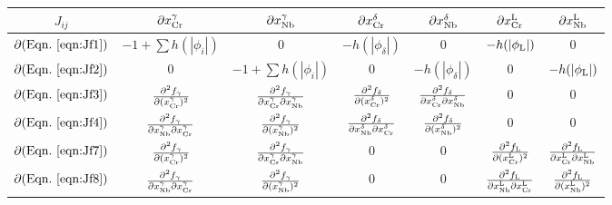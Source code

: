 \documentclass[10pt]{article}
\begin{document}
		\begin{table}[ht]\centering
		\begin{small}
		\setlength\extrarowheight{10pt}
		\begin{tabular}{|c|cccccc|}\hline
		$J_{ij}$  & $\partial x_{\ce{Cr}}^{\gamma}$ & $\partial x_{\ce{Nb}}^{\gamma}$ & $\partial x_{\ce{Cr}}^{\delta}$ & $\partial x_{\ce{Nb}}^{\delta}$
		  & $\partial x_{\ce{Cr}}^{\ce{L}}$ & $\partial x_{\ce{Nb}}^{\ce{L}}$\\\hline
		$\partial (\mathrm{Eqn.}~{\ref{eqn:Jf1}})$ & $-1+\sum h(|\phi_i|)$ & 0 & $-h(|\phi_{\delta}|)$ & 0 & $-h(|\phi_{\ce{L}}|)$ & 0\\
		$\partial (\mathrm{Eqn.}~{\ref{eqn:Jf2}})$ & 0 & $-1+\sum h(|\phi_i|)$ & 0 & $-h(|\phi_{\delta}|)$ & 0 & $-h(|\phi_{\ce{L}}|)$\\
		$\partial (\mathrm{Eqn.}~{\ref{eqn:Jf3}})$ & $\frac{\partial^2 f_{\gamma}}{\partial(x_{\ce{Cr}}^{\gamma})^2}$ & $\frac{\partial^2 f_{\gamma}}{\partial x_{\ce{Cr}}^{\gamma}\partial x_{\ce{Nb}}^{\gamma}}$ 
		& $\frac{\partial^2 f_{\delta}}{\partial(x_{\ce{Cr}}^{\delta})^2}$ & $\frac{\partial^2 f_{\delta}}{\partial x_{\ce{Cr}}^{\delta}\partial x_{\ce{Nb}}^{\delta}}$
		& 0 & 0\\
		$\partial (\mathrm{Eqn.}~{\ref{eqn:Jf4}})$ & $\frac{\partial^2 f_{\gamma}}{\partial x_{\ce{Nb}}^{\gamma}\partial x_{\ce{Cr}}^{\gamma}}$ & $\frac{\partial^2 f_{\gamma}}{\partial(x_{\ce{Nb}}^{\gamma})^2}$
		& $\frac{\partial^2 f_{\delta}}{\partial x_{\ce{Nb}}^{\delta} \partial x_{\ce{Cr}}^{\delta}}$ & $\frac{\partial^2 f_{\delta}}{\partial(x_{\ce{Nb}}^{\delta})^2}$
		& 0 & 0\\
		$\partial (\mathrm{Eqn.}~{\ref{eqn:Jf7}})$ & $\frac{\partial^2 f_{\gamma}}{\partial(x_{\ce{Cr}}^{\gamma})^2}$ & $\frac{\partial^2 f_{\gamma}}{\partial x_{\ce{Cr}}^{\gamma}\partial x_{\ce{Nb}}^{\gamma}}$ 
		& 0 & 0 & $\frac{\partial^2 f_{\ce{L}}}{\partial(x_{\ce{Cr}}^{\ce{L}})^2}$ & $\frac{\partial^2 f_{\ce{L}}}{\partial x_{\ce{Cr}}^{\ce{L}}\partial x_{\ce{Nb}}^{\ce{L}}}$
		\\
		$\partial (\mathrm{Eqn.}~{\ref{eqn:Jf8}})$ & $\frac{\partial^2 f_{\gamma}}{\partial x_{\ce{Nb}}^{\gamma}\partial x_{\ce{Cr}}^{\gamma}}$ & $\frac{\partial^2 f_{\gamma}}{\partial(x_{\ce{Nb}}^{\gamma})^2}$
		& 0 & 0 & $\frac{\partial^2 f_{\ce{L}}}{\partial x_{\ce{Nb}}^{\ce{L}} \partial x_{\ce{Cr}}^{\ce{L}}}$ & $\frac{\partial^2 f_{\ce{L}}}{\partial(x_{\ce{Nb}}^{\ce{L}})^2}$
		\\\hline
		\end{tabular}
		\end{small}
		\end{table}
\end{document}
